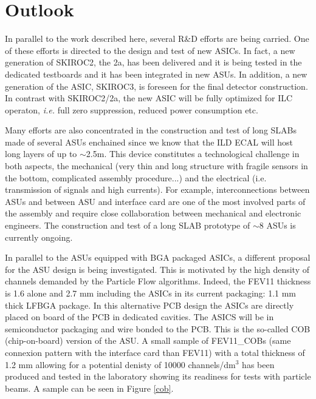 \documentclass[a4paper,11pt]{article}
\begin{document}
\section{Outlook}
\label{sec:outlook}

In parallel to the work described here, several R\&D efforts are being carried.
One of these efforts is directed to the design and test of new ASICs.
In fact, a new generation of SKIROC2, the 2a, has been delivered
and it is being tested in the dedicated testboards and it has been integrated in new ASUs.
In addition, a new generation of the ASIC, SKIROC3, is foreseen for the final detector construction.
In contrast with SKIROC2/2a, the new ASIC will be fully optimized for ILC operaton, {\it i.e.} full zero suppression, reduced power consumption etc.

Many efforts are also concentrated in the construction and test of long SLABs
made of several ASUs enchained since we know that the ILD ECAL will host long layers of up to $\sim$2.5m.
This device constitutes a technological challenge in both aspects, the mechanical
(very thin and long structure with fragile sensors in the bottom, complicated assembly procedure...)
and the electrical (i.e. transmission of signals and high currents).
For example, interconnections between ASUs and between ASU and interface card are one of
the most involved parts of the assembly
and require close collaboration between mechanical and electronic engineers.
The construction and test of a long SLAB prototype
of $\sim8$ ASUs is currently ongoing.

In parallel to the ASUs equipped with BGA packaged ASICs, a different proposal for the ASU
design is being investigated. This is motivated by the high density of channels
demanded by the Particle Flow algorithms. Indeed, the FEV11 thickness is 1.6 alone and 2.7 mm
including the ASICs in its current packaging: 1.1 mm thick LFBGA package.
In this alternative PCB design the ASICs
are directly placed on board of the PCB in dedicated cavities.
The ASICS will be in semiconductor packaging and wire bonded to the PCB. This is the so-called COB (chip-on-board) version of the ASU.
A small sample of FEV11\_COBs (same connexion pattern with the interface card than FEV11)
with a total thickness of 1.2 mm allowing for a potential denisty of 10000 channels/dm$^{3}$ has been produced and tested in the laboratory
showing its readiness for tests with particle beams. A sample can be seen in Figure \ref{cob}.
\end{document}
